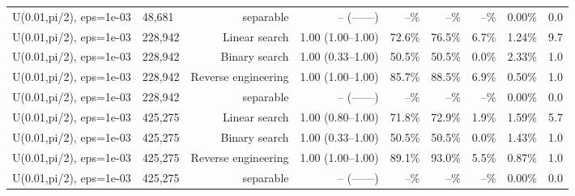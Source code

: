 \begin{tabular}{llrrrrrrr}
U(0.01,pi/2), eps=1e-03 & 48,681 & separable & -- (------) & --\% & --\% & --\% & 0.00\% & 0.0 \\
U(0.01,pi/2), eps=1e-03 & 228,942 & Linear search & 1.00 (1.00--1.00) & 72.6\% & 76.5\% & 6.7\% & 1.24\% & 9.7 \\
U(0.01,pi/2), eps=1e-03 & 228,942 & Binary search & 1.00 (0.33--1.00) & 50.5\% & 50.5\% & 0.0\% & 2.33\% & 1.0 \\
U(0.01,pi/2), eps=1e-03 & 228,942 & Reverse engineering & 1.00 (1.00--1.00) & 85.7\% & 88.5\% & 6.9\% & 0.50\% & 1.0 \\
U(0.01,pi/2), eps=1e-03 & 228,942 & separable & -- (------) & --\% & --\% & --\% & 0.00\% & 0.0 \\
U(0.01,pi/2), eps=1e-03 & 425,275 & Linear search & 1.00 (0.80--1.00) & 71.8\% & 72.9\% & 1.9\% & 1.59\% & 5.7 \\
U(0.01,pi/2), eps=1e-03 & 425,275 & Binary search & 1.00 (0.33--1.00) & 50.5\% & 50.5\% & 0.0\% & 1.43\% & 1.0 \\
U(0.01,pi/2), eps=1e-03 & 425,275 & Reverse engineering & 1.00 (1.00--1.00) & 89.1\% & 93.0\% & 5.5\% & 0.87\% & 1.0 \\
U(0.01,pi/2), eps=1e-03 & 425,275 & separable & -- (------) & --\% & --\% & --\% & 0.00\% & 0.0 \\
\bottomrule
\end{tabular}
